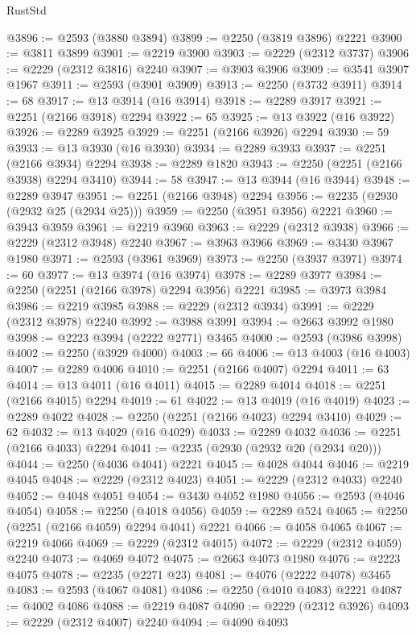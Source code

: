 \begin{lexlean}{RustStd}
\begin{coremodule}
@3896 := @2593 (@3880 @3894)
@3899 := @2250 (@3819 @3896) @2221
@3900 := @3811 @3899
@3901 := @2219 @3900
@3903 := @2229 (@2312 @3737)
@3906 := @2229 (@2312 @3816) @2240
@3907 := @3903 @3906
@3909 := @3541 @3907 @1967
@3911 := @2593 (@3901 @3909)
@3913 := @2250 (@3732 @3911)
@3914 := 68
@3917 := @13 @3914 (@16 @3914)
@3918 := @2289 @3917
@3921 := @2251 (@2166 @3918) @2294
@3922 := 65
@3925 := @13 @3922 (@16 @3922)
@3926 := @2289 @3925
@3929 := @2251 (@2166 @3926) @2294
@3930 := 59
@3933 := @13 @3930 (@16 @3930)
@3934 := @2289 @3933
@3937 := @2251 (@2166 @3934) @2294
@3938 := @2289 @1820
@3943 := @2250 (@2251 (@2166 @3938) @2294 @3410)
@3944 := 58
@3947 := @13 @3944 (@16 @3944)
@3948 := @2289 @3947
@3951 := @2251 (@2166 @3948) @2294
@3956 := @2235 (@2930 (@2932 @25 (@2934 @25)))
@3959 := @2250 (@3951 @3956) @2221
@3960 := @3943 @3959
@3961 := @2219 @3960
@3963 := @2229 (@2312 @3938)
@3966 := @2229 (@2312 @3948) @2240
@3967 := @3963 @3966
@3969 := @3430 @3967 @1980
@3971 := @2593 (@3961 @3969)
@3973 := @2250 (@3937 @3971)
@3974 := 60
@3977 := @13 @3974 (@16 @3974)
@3978 := @2289 @3977
@3984 := @2250 (@2251 (@2166 @3978) @2294 @3956) @2221
@3985 := @3973 @3984
@3986 := @2219 @3985
@3988 := @2229 (@2312 @3934)
@3991 := @2229 (@2312 @3978) @2240
@3992 := @3988 @3991
@3994 := @2663 @3992 @1980
@3998 := @2223 @3994 (@2222 @2771) @3465
@4000 := @2593 (@3986 @3998)
@4002 := @2250 (@3929 @4000)
@4003 := 66
@4006 := @13 @4003 (@16 @4003)
@4007 := @2289 @4006
@4010 := @2251 (@2166 @4007) @2294
@4011 := 63
@4014 := @13 @4011 (@16 @4011)
@4015 := @2289 @4014
@4018 := @2251 (@2166 @4015) @2294
@4019 := 61
@4022 := @13 @4019 (@16 @4019)
@4023 := @2289 @4022
@4028 := @2250 (@2251 (@2166 @4023) @2294 @3410)
@4029 := 62
@4032 := @13 @4029 (@16 @4029)
@4033 := @2289 @4032
@4036 := @2251 (@2166 @4033) @2294
@4041 := @2235 (@2930 (@2932 @20 (@2934 @20)))
@4044 := @2250 (@4036 @4041) @2221
@4045 := @4028 @4044
@4046 := @2219 @4045
@4048 := @2229 (@2312 @4023)
@4051 := @2229 (@2312 @4033) @2240
@4052 := @4048 @4051
@4054 := @3430 @4052 @1980
@4056 := @2593 (@4046 @4054)
@4058 := @2250 (@4018 @4056)
@4059 := @2289 @524
@4065 := @2250 (@2251 (@2166 @4059) @2294 @4041) @2221
@4066 := @4058 @4065
@4067 := @2219 @4066
@4069 := @2229 (@2312 @4015)
@4072 := @2229 (@2312 @4059) @2240
@4073 := @4069 @4072
@4075 := @2663 @4073 @1980
@4076 := @2223 @4075
@4078 := @2235 (@2271 @23)
@4081 := @4076 (@2222 @4078) @3465
@4083 := @2593 (@4067 @4081)
@4086 := @2250 (@4010 @4083) @2221
@4087 := @4002 @4086
@4088 := @2219 @4087
@4090 := @2229 (@2312 @3926)
@4093 := @2229 (@2312 @4007) @2240
@4094 := @4090 @4093

\end{coremodule}
\end{lexlean}
